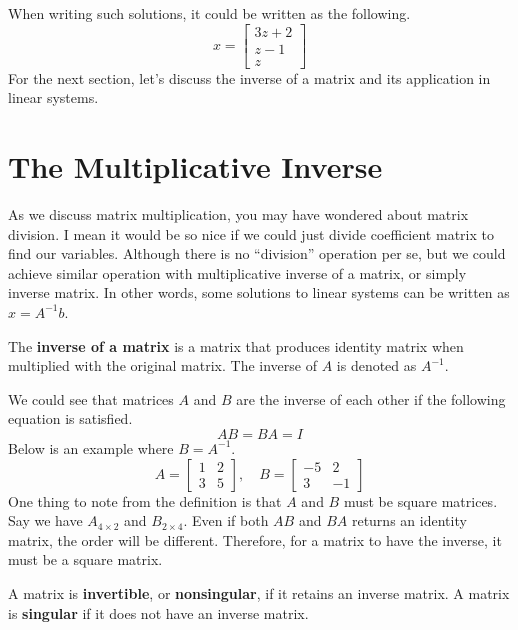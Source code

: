 \documentclass[../main.tex]{subfiles}
\begin{document}
When writing such solutions, it could be written as the following.
\[
x =
\begin{bmatrix}
    3z + 2 \\
    z - 1 \\
    z
\end{bmatrix}
\]
For the next section, let's discuss the inverse of a matrix and its
application in linear systems.

\section{The Multiplicative Inverse}

As we discuss matrix multiplication, you may have wondered about
matrix division. I mean it would be so nice if we could just
divide coefficient matrix to find our variables. Although there
is no ``division'' operation per se, but we could achieve similar
operation with multiplicative inverse of a matrix, or simply
inverse matrix. In other words, some solutions to linear systems
can be written as $x = A^{-1}b$.

\begin{definition}
The \textbf{inverse of a matrix} is a matrix that produces identity
matrix when multiplied with the original matrix. The inverse of
$A$ is denoted as $A^{-1}$.
\end{definition}

We could see that matrices $A$ and $B$ are the inverse of each other
if the following equation is satisfied.
\[
AB = BA = I
\]
Below is an example where $B = A^{-1}$.
\[
A =
\begin{bmatrix}
    1 & 2 \\
    3 & 5
\end{bmatrix},
\quad
B =
\begin{bmatrix}
    -5 & 2 \\
    3  & -1
\end{bmatrix}
\]
One thing to note from the definition is that $A$ and $B$ must be
square matrices. Say we have $A_{4 \times 2}$ and $B_{2 \times 4}$.
Even if both $AB$ and $BA$ returns an identity matrix, the order will
be different. Therefore, for a matrix to have the inverse, it must
be a square matrix.

\begin{definition}
A matrix is \textbf{invertible}, or \textbf{nonsingular}, if it
retains an inverse matrix. A matrix is \textbf{singular} if it
does not have an inverse matrix.
\end{definition}
\end{document}
